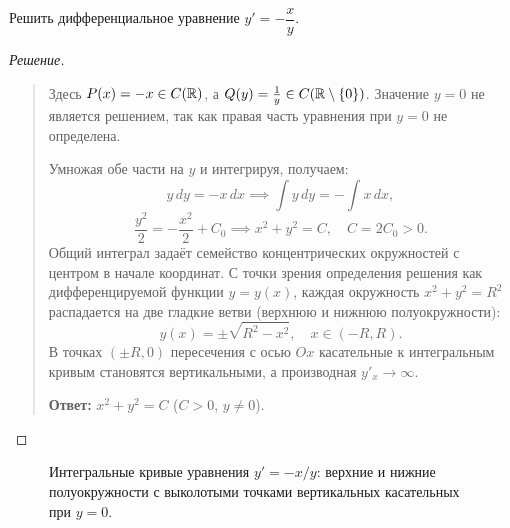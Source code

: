 \begin{example}
    Решить дифференциальное уравнение $y' = -\dfrac{x}{y}$.

    \begin{proof}[Решение]~\\
        \begin{quote}
            Здесь $P(x) = -x \in C(\mathbb{R})$, а $Q(y) = \frac{1}{y} \in C(\mathbb{R} \setminus \{0\})$.
            Значение $y = 0$ не является решением, так как правая часть
            уравнения при $y = 0$ не определена.

            Умножая обе части на $y$ и интегрируя, получаем:
            \[
                y \, dy = -x \, dx \implies \int y \, dy = -\int x \, dx,
            \]
            \[
                \frac{y^2}{2} = -\frac{x^2}{2} + C_0 \implies
                x^2 + y^2 = C, \quad C = 2C_0 > 0.
            \]
            Общий интеграл задаёт семейство концентрических окружностей с
            центром в начале координат. С точки зрения определения решения как
            дифференцируемой функции $y = y(x)$, каждая окружность
            $x^2 + y^2 = R^2$ распадается на две гладкие ветви (верхнюю и
            нижнюю полуокружности):
            \[
                y(x) = \pm \sqrt{R^2 - x^2}, \quad x \in (-R, R).
            \]
            В точках $(\pm R, 0)$ пересечения с осью $Ox$ касательные к
            интегральным кривым становятся вертикальными, а производная
            $y'_x \to \infty$.

            \textbf{Ответ:} $x^2 + y^2 = C$ ($C > 0$, $y \neq 0$).
        \end{quote}
    \end{proof}
\end{example}

\begin{figure}[H]
    \centering
    \caption{Интегральные кривые уравнения $y' = -x/y$: верхние и нижние
    полуокружности с выколотыми точками вертикальных касательных при $y = 0$.}
\end{figure}

